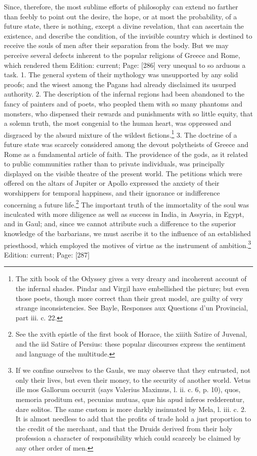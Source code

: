 Since, therefore, the most sublime efforts of philosophy can extend no farther than feebly to point out the desire, the hope, or at most the probability, of a future state, there is nothing, except a divine revelation, that can ascertain the existence, and describe the condition, of the invisible country which is destined to receive the souls of men after their separation from the body. But we may perceive several defects inherent to the popular religions of Greece and Rome, which rendered them Edition: current; Page: [286] very unequal to so arduous a task. 1. The general system of their mythology was unsupported by any solid proofs; and the wisest among the Pagans had already disclaimed its usurped authority. 2. The description of the infernal regions had been abandoned to the fancy of painters and of poets, who peopled them with so many phantoms and monsters, who dispensed their rewards and punishments with so little equity, that a solemn truth, the most congenial to the human heart, was oppressed and disgraced by the absurd mixture of the wildest fictions.\footnote{The xith book of the Odyssey gives a very dreary and incoherent account of the infernal shades. Pindar and Virgil have embellished the picture; but even those poets, though more correct than their great model, are guilty of very strange inconsistencies. See Bayle, Responses aux Questions d\texthebrew{}’un Provincial, part iii. c. 22.} 3. The doctrine of a future state was scarcely considered among the devout polytheists of Greece and Rome as a fundamental article of faith. The providence of the gods, as it related to public communities rather than to private individuals, was principally displayed on the visible theatre of the present world. The petitions which were offered on the altars of Jupiter or Apollo expressed the anxiety of their worshippers for temporal happiness, and their ignorance or indifference concerning a future life.\footnote{See the xvith epistle of the first book of Horace, the xiiith Satire of Juvenal, and the iid Satire of Persius: these popular discourses express the sentiment and language of the multitude.} The important truth of the immortality of the soul was inculcated with more diligence as well as success in India, in Assyria, in Egypt, and in Gaul; and, since we cannot attribute such a difference to the superior knowledge of the barbarians, we must ascribe it to the influence of an established priesthood, which employed the motives of virtue as the instrument of ambition.\footnote{If we confine ourselves to the Gauls, we may observe that they entrusted, not only their lives, but even their money, to the security of another world. Vetus ille mos Gallorum occurrit (says Valerius Maximus, l. ii. c. 6, p. 10), quos, memoria proditum est, pecunias mutuas, quæ his apud inferos redderentur, dare solitos. The same custom is more darkly insinuated by Mela, l. iii. c. 2. It is almost needless to add that the profits of trade hold a just proportion to the credit of the merchant, and that the Druids derived from their holy profession a character of responsibility which could scarcely be claimed by any other order of men.}
Edition: current; Page: [287]

